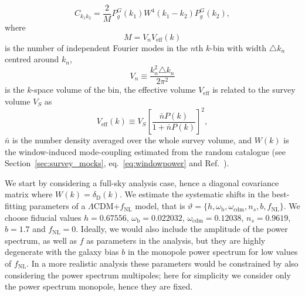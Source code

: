 \documentclass[a4paper,11pt]{article}
\begin{document}
\begin{equation}
    C_{k_1 k_2}=\frac{2}{M}P_g^G(k_1) W^4(k_1-k_2) P_g^G(k_2),
    \label{eq:covariance}
\end{equation}
where 
\begin{equation}
    M=V_n V_\mathrm{eff}(k)
    \label{eq:modes}
\end{equation}
is the number of independent Fourier modes in the $n$th $k$-bin with width $\triangle k_n$ centred around $k_n$,
\begin{equation}
    V_n\equiv \frac{k^2_n\triangle k_n}{2\pi^2}
\end{equation}
is the $k$-space volume of the bin, the effective volume $V_\mathrm{eff}$ is related to the survey volume $V_S$ as
\begin{equation}
    V_\mathrm{eff}(k)\equiv V_S\left[\frac{\bar n P(k)}{1+\bar n P(k)}\right]^2,
\end{equation}
$\bar n$ is the number density averaged over the whole survey volume, and $W(k)$ is the window-induced mode-coupling estimated from the random catalogue (see Section~\ref{sec:survey_mocks}, eq.~\eqref{eq:windowpower} and Ref.~\cite{Feldman:1993ky}).

We start by considering a full-sky analysis case, hence a diagonal covariance matrix where $W(k)=\delta_\mathrm{D}(k)$.  We estimate the systematic shifts in the best-fitting parameters of a $\Lambda$CDM+$f_\mathrm{NL}$ model, that is $\vartheta=\lbrace h, \omega_\mathrm{b}, \omega_\mathrm{cdm}, n_s, b, f_\mathrm{NL}\rbrace$. We choose fiducial values $ h = 0.67556$, $\omega_\mathrm{b} = 0.022032$, $\omega_\mathrm{cdm} = 0.12038$, $n_s = 0.9619$, $b = 1.7$ and $f_\mathrm{NL} = 0$. Ideally, we would also include the amplitude of the power spectrum, as well as $f$ as parameters in the analysis, but they are highly degenerate with the galaxy bias $b$ in the monopole power spectrum for low values of  $f_\mathrm{NL}$. In a more realistic analysis these parameters would be constrained by also considering the power spectrum multipoles; here for simplicity we consider only the power spectrum monopole, hence they are fixed. 
\end{document}
